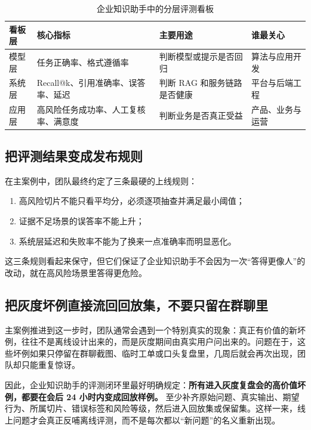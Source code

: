\begin{table}[H]
\centering
\small
\begin{tabularx}{\textwidth}{>{\raggedright\arraybackslash}p{2.8cm}>{\raggedright\arraybackslash}p{3cm}>{\raggedright\arraybackslash}p{3cm}>{\raggedright\arraybackslash}X}
\toprule
\textbf{看板层} & \textbf{核心指标} & \textbf{主要用途} & \textbf{谁最关心} \\
\midrule
模型层 & 任务正确率、格式遵循率 & 判断模型或提示是否回归 & 算法与应用开发 \\
系统层 & Recall@k、引用准确率、误答率、延迟 & 判断 RAG 和服务链路是否健康 & 平台与后端工程 \\
应用层 & 高风险任务成功率、人工复核率、满意度 & 判断业务是否真正受益 & 产品、业务与运营 \\
\bottomrule
\end{tabularx}
\caption{企业知识助手中的分层评测看板}
\label{tab:eval-dashboard}
\end{table}

\subsection{把评测结果变成发布规则}
在主案例中，团队最终约定了三条最硬的上线规则：
\begin{enumerate}
  \item 高风险切片不能只看平均分，必须逐项抽查并满足最小阈值；
  \item 证据不足场景的误答率不能上升；
  \item 系统层延迟和失败率不能为了换来一点准确率而明显恶化。
\end{enumerate}

这三条规则看起来保守，但它们保证了企业知识助手不会因为一次“答得更像人”的改动，就在高风险场景里答得更危险。

\subsection{把灰度坏例直接流回回放集，不要只留在群聊里}
主案例推进到这一步时，团队通常会遇到一个特别真实的现象：真正有价值的新坏例，往往不是离线设计出来的，而是灰度期间由真实用户问出来的。问题在于，这些坏例如果只停留在群聊截图、临时工单或口头复盘里，几周后就会再次出现，团队却只能重复惊讶。

因此，企业知识助手的评测闭环里最好明确规定：\textbf{所有进入灰度复盘会的高价值坏例，都要在会后 24 小时内变成回放样例。} 至少补齐原始问题、真实输出、期望行为、所属切片、错误标签和风险等级，然后进入回放集或保留集。这样一来，线上问题才会真正反哺离线评测，而不是每次都以“新问题”的名义重新出现。

